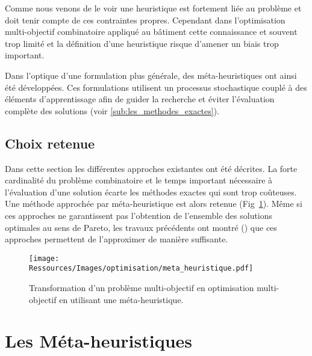 Comme nous venons de le voir une heuristique est fortement liée au problème et
doit tenir compte de ces contraintes propres. Cependant dans l’optimisation
multi-objectif combinatoire appliqué au bâtiment cette connaissance et souvent
trop limité et la définition d’une heuristique risque d’amener un biais trop
important.

Dans l’optique d’une formulation plus générale, des méta-heuristiques ont ainsi
été développées. Ces formulations utilisent un processus stochastique couplé à des
éléments d’apprentissage afin de guider la recherche et éviter l’évaluation
complète des solutions (voir \ref{sub:les_methodes_exactes}).



\subsection{Choix retenue} %
\label{sub:choix_retenue}
Dans cette section les différentes approches existantes ont été décrites. La
forte cardinalité du problème combinatoire et le temps important nécessaire à
l’évaluation d’une solution écarte les méthodes exactes qui sont trop coûteuses.
Une méthode approchée par méta-heuristique est alors retenue
(Fig~\ref{fig:multi_meta}). Même si ces approches ne garantissent pas
l’obtention de l’ensemble des solutions optimales au sens de Pareto, les travaux
précédents ont montré () que ces approches permettent de
l’approximer de manière suffisante.

\begin{figure}
    \begin{center}
        \texttt{[image: Ressources/Images/optimisation/meta\_heuristique.pdf]}
    \end{center}
    \caption{Transformation d’un problème multi-objectif en optimisation
             multi-objectif en utilisant une méta-heuristique.
             \label{fig:multi_meta}}
\end{figure}




\section{Les Méta-heuristiques} %
\label{sec:les_meta_heuristiques}
